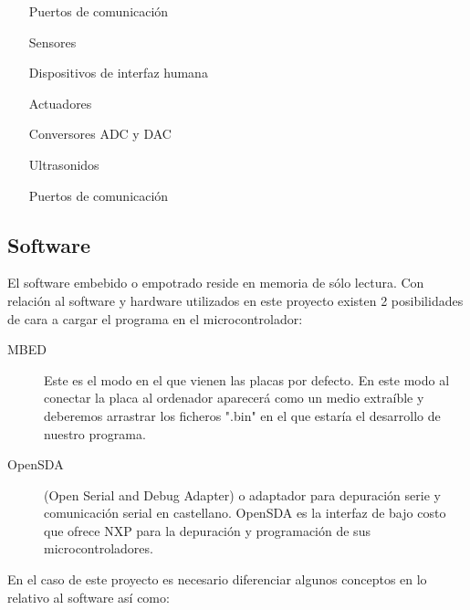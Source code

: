 \begin{itemize}
\item[Puertos de comunicación]
\item[Sensores]
\item[Dispositivos de interfaz humana]
\item[Actuadores]
\item[Conversores ADC y DAC]
\item[Ultrasonidos]
\item[Puertos de comunicación]
\end{itemize}


\subsection{Software}

El software embebido o empotrado reside en memoria de sólo lectura. Con relación al software y hardware utilizados en este proyecto existen 2 posibilidades de cara a cargar el programa en el microcontrolador:
\begin{description}
\item[MBED] Este es el modo en el que vienen las placas por defecto. En este modo al conectar la placa al ordenador aparecerá como un medio extraíble y deberemos arrastrar los ficheros ".bin" en el que estaría el desarrollo de nuestro programa.
\item[OpenSDA] (Open Serial and Debug Adapter) o adaptador para depuración serie y comunicación serial en castellano. OpenSDA es la interfaz de bajo costo que ofrece NXP para la depuración y programación de sus
microcontroladores.
\end{description}



En el caso de este proyecto es necesario diferenciar algunos conceptos en lo relativo al software así como:

